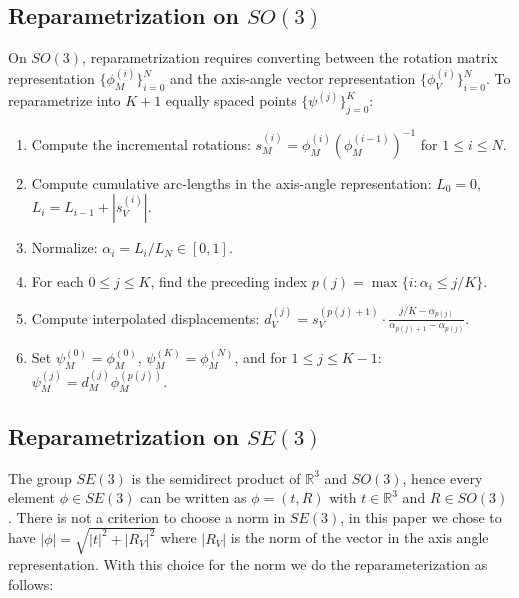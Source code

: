 \documentclass{article}
\theoremstyle{plain}
\theoremstyle{definition}
\theoremstyle{remark}
\begin{document}
\subsection{Reparametrization on $SO(3)$}

On $SO(3)$, reparametrization requires converting between the rotation matrix representation $\{\phi^{(i)}_M\}_{i=0}^N$ and the axis-angle vector representation $\{\phi^{(i)}_V\}_{i=0}^N$. To reparametrize into $K+1$ equally spaced points $\{\psi^{(j)}\}_{j=0}^K$:
\begin{enumerate}
    \item Compute the incremental rotations: $s^{(i)}_M = \phi^{(i)}_M (\phi^{(i-1)}_M)^{-1}$ for $1 \le i \le N$.
    \item Compute cumulative arc-lengths in the axis-angle representation: $L_0 = 0$, $L_i = L_{i-1} + |s^{(i)}_V|$.
    \item Normalize: $\alpha_i = L_i / L_N \in [0,1]$.
    \item For each $0 \le j \le K$, find the preceding index $p(j) = \max\{i : \alpha_i \le j/K\}$.
    \item Compute interpolated displacements: $d^{(j)}_V = s^{(p(j)+1)}_V \cdot \frac{j/K - \alpha_{p(j)}}{\alpha_{p(j)+1} - \alpha_{p(j)}}$.
    \item Set $\psi^{(0)}_M = \phi^{(0)}_M$, $\psi^{(K)}_M = \phi^{(N)}_M$, and for $1 \le j \le K-1$: $\psi^{(j)}_M = d^{(j)}_M \phi^{(p(j))}_M$.
\end{enumerate}

\subsection{Reparametrization on $SE(3)$}

The group $SE(3)$ is the semidirect product of $\mathbb{R}^3$ and $SO(3)$, hence every element $\phi \in SE(3)$ can be written as $\phi = (t,R)$ with $t \in \mathbb{R}^3$ and $R \in SO(3)$. There is not a criterion to choose a norm in $SE(3)$, in this paper we chose to have $|\phi| = \sqrt{|t|^2 + |R_V|^2}$ where $|R_V|$ is the norm of the vector in the axis angle representation. With this choice for the norm we do the reparameterization as follows:
\end{document}
